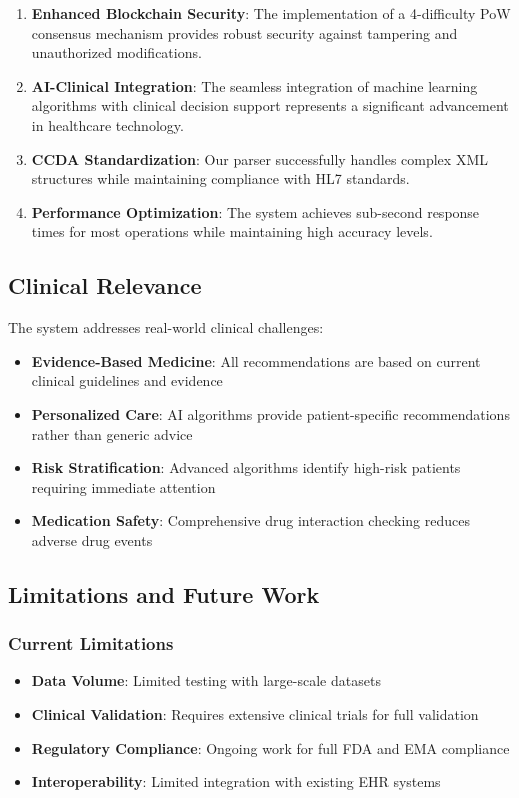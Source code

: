 \documentclass[conference]{IEEEtran}
\begin{document}
\begin{enumerate}
    \item \textbf{Enhanced Blockchain Security}: The implementation of a 4-difficulty PoW consensus mechanism provides robust security against tampering and unauthorized modifications.
    
    \item \textbf{AI-Clinical Integration}: The seamless integration of machine learning algorithms with clinical decision support represents a significant advancement in healthcare technology.
    
    \item \textbf{CCDA Standardization}: Our parser successfully handles complex XML structures while maintaining compliance with HL7 standards.
    
    \item \textbf{Performance Optimization}: The system achieves sub-second response times for most operations while maintaining high accuracy levels.
\end{enumerate}

\subsection{Clinical Relevance}

The system addresses real-world clinical challenges:
\begin{itemize}
    \item \textbf{Evidence-Based Medicine}: All recommendations are based on current clinical guidelines and evidence
    \item \textbf{Personalized Care}: AI algorithms provide patient-specific recommendations rather than generic advice
    \item \textbf{Risk Stratification}: Advanced algorithms identify high-risk patients requiring immediate attention
    \item \textbf{Medication Safety}: Comprehensive drug interaction checking reduces adverse drug events
\end{itemize}

\subsection{Limitations and Future Work}

\subsubsection{Current Limitations}
\begin{itemize}
    \item \textbf{Data Volume}: Limited testing with large-scale datasets
    \item \textbf{Clinical Validation}: Requires extensive clinical trials for full validation
    \item \textbf{Regulatory Compliance}: Ongoing work for full FDA and EMA compliance
    \item \textbf{Interoperability}: Limited integration with existing EHR systems
\end{itemize}
\end{document}
